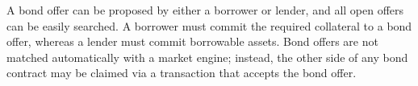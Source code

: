 A bond offer can be proposed by either a borrower or lender, and all open
offers can be easily searched. A borrower must commit the required collateral
to a bond offer, whereas a lender must commit borrowable assets. Bond offers
are not matched automatically with a market engine; instead, the other side of
any bond contract may be claimed via a transaction that accepts the bond offer.
